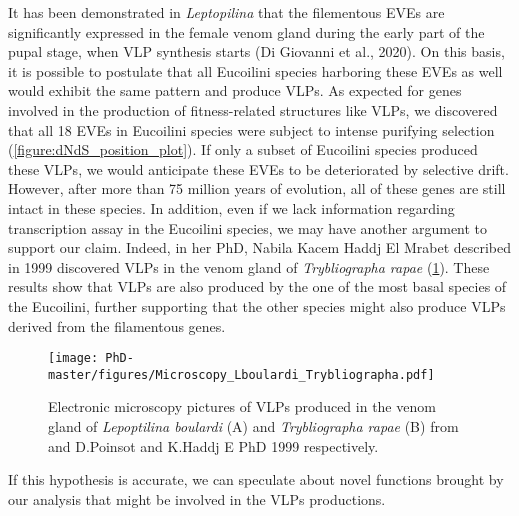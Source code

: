 It has been demonstrated in \textit{Leptopilina} that the filementous EVEs are significantly expressed in the female venom gland during the early part of the pupal stage, when VLP synthesis starts (Di Giovanni et al., 2020). On this basis, it is possible to postulate that all Eucoilini species harboring these EVEs as well would exhibit the same pattern and produce VLPs. As expected for genes involved in the production of fitness-related structures like VLPs, we discovered that all 18 EVEs in Eucoilini species were subject to intense purifying selection (\figurename{\ref{figure:dNdS_position_plot}}). If only a subset of Eucoilini species produced these VLPs, we would anticipate these EVEs to be deteriorated by selective drift. However, after more than 75 million years of evolution, all of these genes are still intact in these species. In addition, even if we lack information regarding transcription assay in the Eucoilini species, we may have another argument to support our claim. Indeed, in her PhD, Nabila Kacem Haddj El Mrabet described in 1999 discovered VLPs in the venom gland of \textit{Trybliographa rapae} (\figurename{\ref{figure:Microscopy_Lboulardi_Trybliographa}}). These results show that VLPs are also produced by the one of the most basal species of the Eucoilini, further supporting that the other species might also produce VLPs derived from the filamentous genes. 

\begin{figure}[!htpbt]
\texttt{[image: PhD-master/figures/Microscopy\_Lboulardi\_Trybliographa.pdf]}\centering
\caption[Paper3:[Electronic microscopy of \textit{L.boulardi} and \textit{T.rapae} VLPs]{Electronic microscopy pictures of VLPs produced in the venom gland of \textit{Lepoptilina boulardi} (A) and \textit{Trybliographa rapae} (B) from \cite{di_giovanni_behavior-manipulating_2020} and D.Poinsot and K.Haddj E PhD 1999 respectively.}
\label{figure:Microscopy_Lboulardi_Trybliographa}
\end{figure}

If this hypothesis is accurate, we can speculate about novel functions brought by our analysis that might be involved in the VLPs productions. 

